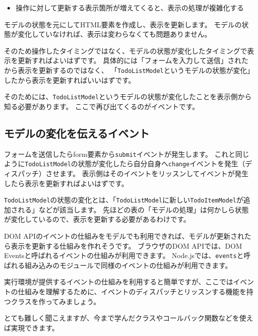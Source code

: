 \begin{itemize}
\item 操作に対して更新する表示箇所が増えてくると、表示の処理が複雑化する
\end{itemize}

モデルの状態を元にしてHTML要素を作成し、表示を更新します。
モデルの状態が変化していなければ、表示は変わらなくても問題ありません。

そのため操作したタイミングではなく、モデルの状態が変化したタイミングで表示を更新すればよいはずです。
具体的には「フォームを入力して送信」されたから表示を更新するのではなく、
「\texttt{TodoListModel}というモデルの状態が変化」したから表示を更新すればいいはずです。

そのためには、\texttt{TodoListModel}というモデルの状態が変化したことを表示側から知る必要があります。
ここで再び出てくるのがイベントです。

\hypertarget{model-and-event}{%
\subsection{モデルの変化を伝えるイベント}\label{model-and-event}}

フォームを送信したらform要素から\texttt{submit}イベントが発生します。
これと同じように\texttt{TodoListModel}の状態が変化したら自分自身へ\texttt{change}イベントを発生（ディスパッチ）させます。
表示側はそのイベントをリッスンしてイベントが発生したら表示を更新すればよいはずです。

\texttt{TodoListModel}の状態の変化とは、「\texttt{TodoListModel}に新しい\texttt{TodoItemModel}が追加される」などが該当します。
先ほどの表の「モデルの処理」は何かしら状態が変化しているので、表示を更新する必要があるわけです。

DOM
APIのイベントの仕組みをモデルでも利用できれば、モデルが更新されたら表示を更新する仕組みを作れそうです。
ブラウザのDOM APIでは、DOM
Eventsと呼ばれるイベントの仕組みが利用できます。
Node.jsでは、\texttt{events}と呼ばれる組み込みのモジュールで同様のイベントの仕組みが利用できます。

実行環境が提供するイベントの仕組みを利用すると簡単ですが、ここではイベントの仕組みを理解するために、イベントのディスパッチとリッスンする機能を持つクラスを作ってみましょう。

とても難しく聞こえますが、今まで学んだクラスやコールバック関数などを使えば実現できます。

